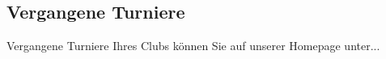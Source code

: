 \subsection{Vergangene Turniere}

\noindent
Vergangene Turniere Ihres Clubs können Sie auf unserer Homepage unter...
